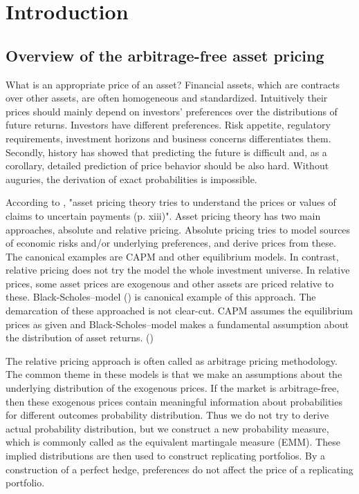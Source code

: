 \chapter{Introduction}

\section{Overview of the arbitrage-free asset pricing}

What is an appropriate price of an asset? Financial assets, which are contracts over other assets, are often homogeneous and standardized. Intuitively their prices should mainly depend on investors' preferences over the distributions of future returns. Investors have different preferences.  Risk appetite, regulatory requirements, investment horizons and business concerns differentiates them. Secondly, history has showed that predicting the future is difficult and, as a corollary, detailed prediction of price behavior should be also hard. Without auguries, the derivation of exact probabilities is impossible. 

According to \textcite{cochrane2009asset}, "asset pricing theory tries to understand the prices or values of claims to uncertain payments (p. xiii)". Asset pricing theory has two main approaches, absolute and relative pricing. Absolute pricing tries to model sources of economic risks and/or underlying preferences, and derive prices from these. The canonical examples are CAPM and other equilibrium models. In contrast, relative pricing does not try the model the whole investment universe. In relative prices, some asset prices are exogenous and other assets are priced relative to these. Black-Scholes--model (\cite{blackscholes1973pricing}) is canonical example of this approach. The demarcation of these approached is not clear-cut. CAPM assumes the equilibrium prices as given and Black-Scholes--model makes a fundamental assumption about the distribution of asset returns. (\cite[pp. xiii--xiv]{cochrane2009asset})

The relative pricing approach is often called as arbitrage pricing methodology. The common theme in these models is that we make an assumptions about the underlying distribution of the exogenous prices. If the market is arbitrage-free, then these exogenous prices contain meaningful information about probabilities for different outcomes probability distribution. Thus we do not try to derive actual probability distribution, but we construct a new probability measure, which is commonly called as the equivalent martingale measure (EMM).  These implied distributions are then used to construct replicating portfolios. By a construction of a perfect hedge, preferences do not affect the price of a replicating portfolio. 

